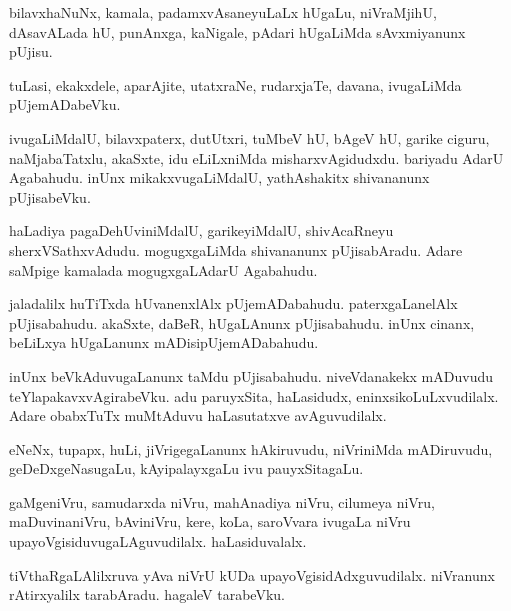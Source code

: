 \documentclass{article}
\begin{document}
\begin{mn}
bilavxhaNuNx,  kamala,  padamxvAsaneyuLaLx  hUgaLu,  niVraMjihU,  dAsavALada  hU,  punAnxga,  
kaNigale,  pAdari  hUgaLiMda  sAvxmiyanunx  pUjisu.
\end{mn}

\begin{mn}
tuLasi,  ekakxdele,  aparAjite,  utatxraNe,  rudarxjaTe,  davana,  ivugaLiMda  pUjemADabeVku.
\end{mn}

\begin{mn}
ivugaLiMdalU,  bilavxpaterx,  dutUtxri,  tuMbeV hU,  bAgeV hU,  garike  ciguru,  naMjabaTatxlu,  akaSxte,  idu  eLiLxniMda  
misharxvAgidudxdu.  bariyadu  AdarU  Agabahudu.  inUnx  mikakxvugaLiMdalU,  yathAshakitx  shivananunx  pUjisabeVku.
\end{mn}

\begin{mn}
haLadiya  pagaDehUviniMdalU,  garikeyiMdalU,  shivAcaRneyu  sherxVSathxvAdudu.  mogugxgaLiMda  shivananunx  
pUjisabAradu.  Adare  saMpige  kamalada  mogugxgaLAdarU  Agabahudu.
\end{mn}

\begin{mn}
jaladalilx  huTiTxda  hUvanenxlAlx  pUjemADabahudu.  paterxgaLanelAlx  pUjisabahudu.  akaSxte,  daBeR,  
hUgaLAnunx  pUjisabahudu.  inUnx  cinanx,  beLiLxya  hUgaLanunx  mADisipUjemADabahudu.
\end{mn}

\begin{mn}
inUnx  beVkAduvugaLanunx  taMdu  pUjisabahudu.  niveVdanakekx  mADuvudu  teYlapakavxvAgirabeVku.  adu  
paruyxSita,  haLasidudx,  eninxsikoLuLxvudilalx.  Adare  obabxTuTx  muMtAduvu  haLasutatxve  avAguvudilalx.
\end{mn}

\begin{mn}
eNeNx,  tupapx,  huLi,  jiVrigegaLanunx  hAkiruvudu,  niVriniMda  mADiruvudu,  geDeDxgeNasugaLu,  
kAyipalayxgaLu  ivu  pauyxSitagaLu.
\end{mn}

\begin{mn}
gaMgeniVru,  samudarxda  niVru,  mahAnadiya  niVru,  cilumeya niVru,  maDuvinaniVru,  bAviniVru,  kere,  
koLa,  saroVvara  ivugaLa  niVru  upayoVgisiduvugaLAguvudilalx.  haLasiduvalalx.
\end{mn}

\begin{mn}
tiVthaRgaLAlilxruva  yAva  niVrU  kUDa  upayoVgisidAdxguvudilalx.  niVranunx  rAtirxyalilx  tarabAradu.  hagaleV  tarabeVku.
\end{mn}
\end{document}
